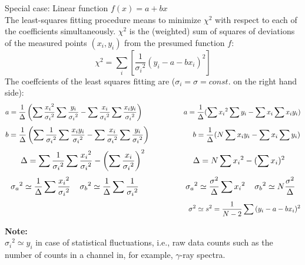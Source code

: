 \documentclass[12pt]{article}
\begin{document}
{\large Special case: Linear function $f(x)=a+bx$}\\
The least-squares fitting procedure means to minimize $\chi^2$ with
respect to each of the coefficients simultaneously. $\chi^2$ is the
(weighted) sum of squares of deviations of the measured points
$(x_i,y_i)$ from the presumed function $f$:\\
\begin{displaymath}
\chi^2=\sum_i{\left[\frac{1}{{\sigma_i}^2}(y_i-a-bx_i)^2\right]}
\end{displaymath}
The coeffcients of the least squares fitting are ($\sigma_i=\sigma=const.$ on
the right hand side):\\
\begin{displaymath}
a=\frac{1}{\Delta}\left(
\sum{\frac{{x_i}^2}{{\sigma_i}^2}}
\sum{\frac{y_i}{{\sigma_i}^2}} -
\sum{\frac{x_i}{{\sigma_i}^2}}
\sum{\frac{x_iy_i}{{\sigma_i}^2}}\right)\hspace*{2cm}
a=\frac{1}{\Delta}(\sum{{x_i}^2}\sum{y_i}-\sum{x_i}\sum{x_iy_i})
\end{displaymath}
\begin{displaymath}
b=\frac{1}{\Delta}\left(
\sum{\frac{1}{{\sigma_i}^2}}
\sum{\frac{x_iy_i}{{\sigma_i}^2}} -
\sum{\frac{x_i}{{\sigma_i}^2}}
\sum{\frac{y_i}{{\sigma_i}^2}}\right)\hspace*{2cm}
b=\frac{1}{\Delta}(N\sum{x_iy_i}-\sum{x_i}\sum{y_i})
\end{displaymath}
\begin{displaymath}
\Delta=\sum{\frac{1}{{\sigma_i}^2}}
\sum{\frac{{x_i}^2}{{\sigma_i}^2}} -
\left(\sum{\frac{x_i}{{\sigma_i}^2}}\right)^2\hspace*{2cm}
\Delta=N\sum{{x_i}^2}-(\sum{x_i})^2
\end{displaymath}
\begin{displaymath}
{\sigma_a}^2\simeq \frac{1}{\Delta}\sum{\frac{{x_i}^2}{{\sigma_i}^2}}
\hspace*{4mm}
{\sigma_b}^2\simeq \frac{1}{\Delta}\sum{\frac{1}{{\sigma_i}^2}}
\hspace*{2cm}
{\sigma_a}^2\simeq \frac{\sigma^2}{\Delta}\sum{{x_i}^2}
\hspace*{4mm}
{\sigma_b}^2\simeq N\frac{\sigma^2}{\Delta}
\end{displaymath}
\begin{displaymath}
\hspace*{9cm}
\sigma^2\simeq s^2=\frac{1}{N-2}\sum{(y_i-a-bx_i)^2}
\end{displaymath}

{\bf Note:}\\
${\sigma_i}^2\simeq y_i$ in case of statistical fluctuations, i.e.,
raw data counts such as the number of counts in a channel in, for
example, $\gamma$-ray spectra.
\end{document}
